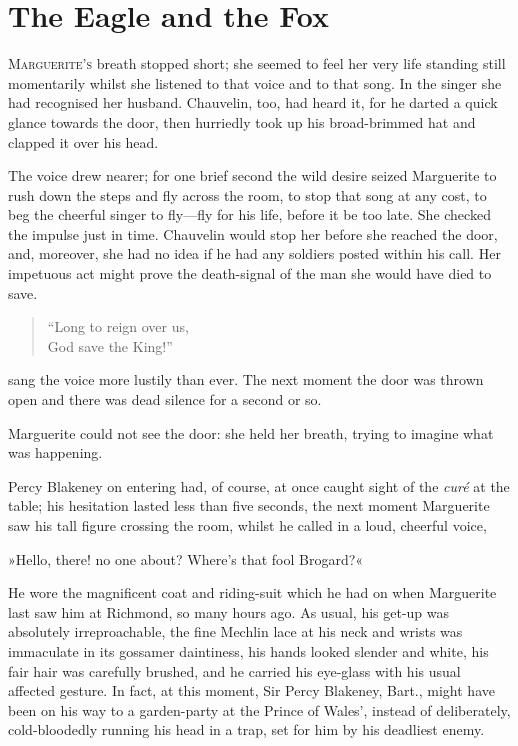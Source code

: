
\chapter{The Eagle and the Fox}
\lettrine[lines=4]{M}{arguerite's} breath stopped short; she seemed to feel her very life standing still momentarily whilst she listened to that voice and to that song. In the singer she had recognised her husband. Chauvelin, too, had heard it, for he darted a quick glance towards the door, then hurriedly took up his broad-brimmed hat and clapped it over his head.

The voice drew nearer; for one brief second the wild desire seized Marguerite to rush down the steps and fly across the room, to stop that song at any cost, to beg the cheerful singer to fly\allowbreak---\allowbreak fly for his life, before it be too late. She checked the impulse just in time. Chauvelin would stop her before she reached the door, and, moreover, she had no idea if he had any soldiers posted within his call. Her impetuous act might prove the death-signal of the man she would have died to save.

\blockquote{
\enquote{Long to reign over us,\\
God save the King!}
}

sang the voice more lustily than ever. The next moment the door was thrown open and there was dead silence for a second or so.

Marguerite could not see the door: she held her breath, trying to imagine what was happening.

Percy Blakeney on entering had, of course, at once caught sight of the \textit{curé} at the table; his hesitation lasted less than five seconds, the next moment Marguerite saw his tall figure crossing the room, whilst he called in a loud, cheerful voice,\longdash


»Hello, there! no one about? Where's that fool Brogard?«

He wore the magnificent coat and riding-suit which he had on when Marguerite last saw him at Richmond, so many hours ago. As usual, his get-up was absolutely irreproachable, the fine Mechlin lace at his neck and wrists was immaculate in its gossamer daintiness, his hands looked slender and white, his fair hair was carefully brushed, and he carried his eye-glass with his usual affected gesture. In fact, at this moment, Sir Percy Blakeney, Bart., might have been on his way to a garden-party at the Prince of Wales', instead of deliberately, cold-bloodedly running his head in a trap, set for him by his deadliest enemy.

